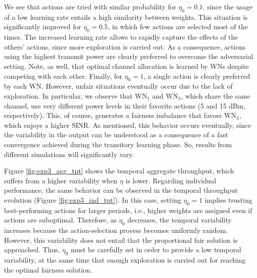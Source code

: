 \documentclass[preprint,12pt]{elsarticle}
\begin{document}
We see that actions are tried with similar probability for $\eta_0 = 0.1$, since the usage of a low learning rate entails a high similarity between weights. This situation is significantly improved for $\eta_0 = 0.5$, in which few actions are selected most of the times. The increased learning rate allows to rapidly capture the effects of the others' actions, since more exploration is carried out. As a consequence, actions using the highest transmit power are clearly preferred to overcome the adversarial setting. Note, as well, that optimal channel allocation is learned by WNs despite competing with each other. Finally, for $\eta_0 = 1$, a single action is clearly preferred by each WN. However, unfair situations eventually occur due to the lack of exploration. In particular, we observe that $\text{WN}_1$ and $\text{WN}_3$, which share the same channel, use very different power levels in their favorite actions (5 and 15 dBm, respectively). This, of course, generates a fairness imbalance that favors $\text{WN}_3$, which enjoys a higher SINR. As mentioned, this behavior occurs eventually, since the variability in the output can be understood as a consequence of a fast convergence achieved during the transitory learning phase. So, results from different simulations will significantly vary.

Figure \ref{fig:exp3_agg_tpt} shows the temporal aggregate throughput, which suffers from a higher variability when $\eta$ is lower. Regarding individual performance, the same behavior can be observed in the temporal throughput evolution (Figure \ref{fig:exp3_ind_tpt}). In this case, setting $\eta_0 = 1$ implies trusting best-performing actions for larger periods, i.e., higher weights are assigned even if actions are suboptimal. Therefore, as $\eta_0$ decreases, the temporal variability increases because the action-selection process becomes uniformly random. However, this variability does not entail that the proportional fair solution is approached. Thus, $\eta_0$ must be carefully set in order to provide a low temporal variability, at the same time that enough exploration is carried out for reaching the optimal fairness solution.
\end{document}
